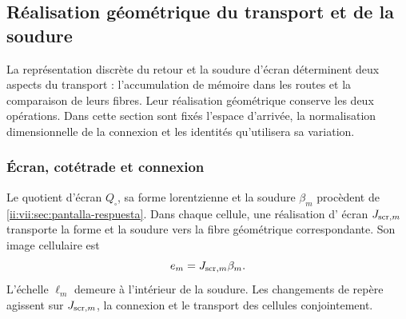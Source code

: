 


\subsection{Réalisation géométrique du transport et de la soudure}
\label{ii:vii:sec:realizacion-cartan}

La représentation discrète du retour et la soudure d'écran déterminent deux aspects du transport : l'accumulation de mémoire dans les routes et la comparaison de leurs fibres. Leur réalisation géométrique conserve les deux opérations. Dans cette section sont fixés l'espace d'arrivée, la normalisation dimensionnelle de la connexion et les identités qu'utilisera sa variation.

\subsubsection{Écran, cotétrade et connexion}

Le quotient d'écran \(Q_\square\), sa forme lorentzienne et la
soudure \(\beta_m\) procèdent de
\ref{ii:vii:sec:pantalla-respuesta}. Dans chaque cellule, une réalisation d'
écran \(J_{{\rm scr},m}\) transporte la forme et la soudure
vers la fibre géométrique correspondante. Son image cellulaire est
\[
 e_m=J_{{\rm scr},m}\beta_m.
\]
L'échelle \(\ell_m\) demeure à l'intérieur de la soudure. Les
changements de repère agissent sur \(J_{{\rm scr},m}\), la connexion
et le transport des cellules conjointement.


